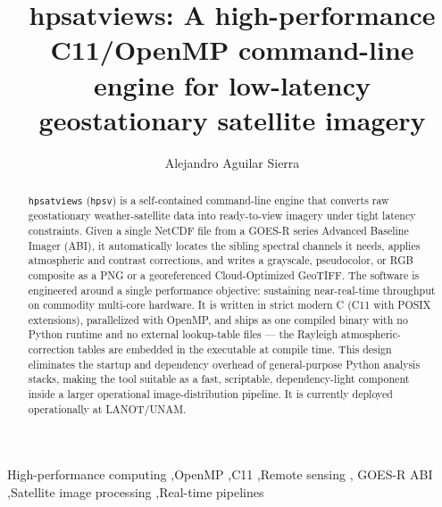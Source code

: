 \documentclass[preprint,12pt]{elsarticle}
\begin{document}
\begin{frontmatter}

\title{hpsatviews: A high-performance C11/OpenMP command-line engine for
low-latency geostationary satellite imagery}

\author[lanot]{Alejandro Aguilar Sierra}

\address[lanot]{Laboratorio Nacional de Observaci\'on de la Tierra (LANOT),
Universidad Nacional Aut\'onoma de M\'exico (UNAM), Mexico}

\begin{abstract}
\texttt{hpsatviews} (\texttt{hpsv}) is a self-contained command-line engine
that converts raw geostationary weather-satellite data into ready-to-view
imagery under tight latency constraints. Given a single NetCDF file from a
GOES-R series Advanced Baseline Imager (ABI), it automatically locates the
sibling spectral channels it needs, applies atmospheric and contrast
corrections, and writes a grayscale, pseudocolor, or RGB composite as a PNG
or a georeferenced Cloud-Optimized GeoTIFF. The software is engineered around
a single performance objective: sustaining near-real-time throughput on
commodity multi-core hardware. It is written in strict modern C (C11 with
POSIX extensions), parallelized with OpenMP, and ships as one compiled binary
with no Python runtime and no external lookup-table files --- the Rayleigh
atmospheric-correction tables are embedded in the executable at compile time.
This design eliminates the startup and dependency overhead of general-purpose
Python analysis stacks, making the tool suitable as a fast, scriptable,
dependency-light component inside a larger operational image-distribution
pipeline. It is currently deployed operationally at LANOT/UNAM.
\end{abstract}

\begin{keyword}
High-performance computing \sep OpenMP \sep C11 \sep Remote sensing \sep
GOES-R ABI \sep Satellite image processing \sep Real-time pipelines
\end{keyword}

\end{frontmatter}

\end{document}
